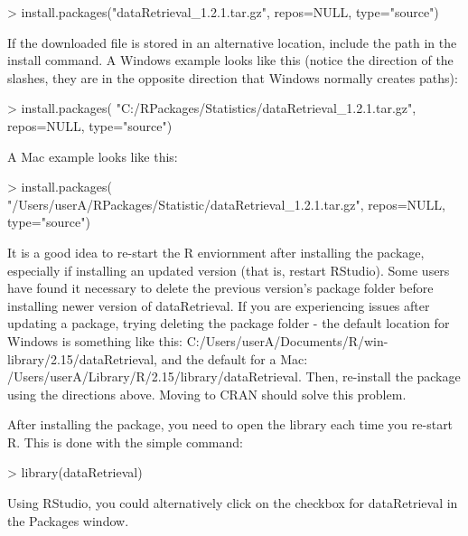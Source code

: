 \documentclass[a4paper,11pt]{article}
\begin{document}
\begin{Schunk}
\begin{Sinput}
> install.packages("dataRetrieval_1.2.1.tar.gz", 
                  repos=NULL, type="source")
\end{Sinput}
\end{Schunk}

If the downloaded file is stored in an alternative location, include the path in the install command.  A Windows example looks like this (notice the direction of the slashes, they are in the opposite direction that Windows normally creates paths):

\begin{Schunk}
\begin{Sinput}
> install.packages(
   "C:/RPackages/Statistics/dataRetrieval_1.2.1.tar.gz", 
   repos=NULL, type="source")
\end{Sinput}
\end{Schunk}

A Mac example looks like this:

\begin{Schunk}
\begin{Sinput}
> install.packages(
   "/Users/userA/RPackages/Statistic/dataRetrieval_1.2.1.tar.gz", 
   repos=NULL, type="source")
\end{Sinput}
\end{Schunk}

It is a good idea to re-start the R enviornment after installing the package, especially if installing an updated version (that is, restart RStudio). Some users have found it necessary to delete the previous version's package folder before installing newer version of dataRetrieval. If you are experiencing issues after updating a package, trying deleting the package folder - the default location for Windows is something like this: C:/Users/userA/Documents/R/win-library/2.15/dataRetrieval, and the default for a Mac: /Users/userA/Library/R/2.15/library/dataRetrieval. Then, re-install the package using the directions above. Moving to CRAN should solve this problem.

After installing the package, you need to open the library each time you re-start R.  This is done with the simple command:
\begin{Schunk}
\begin{Sinput}
> library(dataRetrieval)
\end{Sinput}
\end{Schunk}
Using RStudio, you could alternatively click on the checkbox for dataRetrieval in the Packages window.
\end{document}
